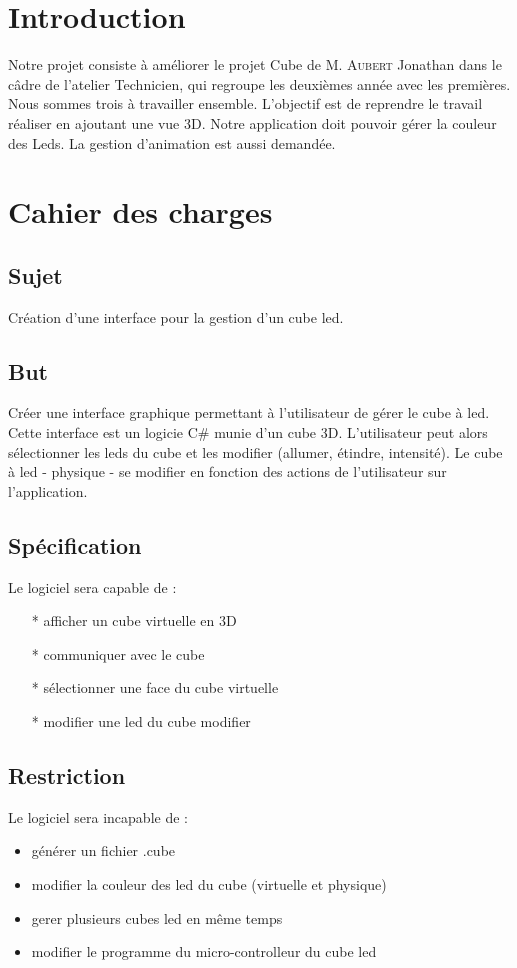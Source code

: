 \documentclass[a4paper,12pt]{article}
\begin{document}
\tableofcontents
\newpage

\section{Introduction}
Notre projet consiste à améliorer le projet Cube de M. \textsc{Aubert} Jonathan dans le câdre de l'atelier Technicien, qui regroupe les deuxièmes année avec les premières. Nous sommes trois à travailler ensemble. L'objectif est de reprendre le travail réaliser en ajoutant une vue 3D. Notre application doit pouvoir gérer la couleur des Leds. La gestion d'animation est aussi demandée.
\newpage

\section{Cahier des charges}
\subsection{Sujet}
Création d'une interface pour la gestion d'un cube led.

\subsection{But}
Créer une interface graphique permettant à l'utilisateur de gérer le cube à led. Cette interface est un logicie C\# munie d'un cube 3D. L'utilisateur peut alors sélectionner les leds du cube et les modifier (allumer, étindre, intensité). Le cube à led - physique - se modifier en fonction des actions de l'utilisateur sur l'application.
\subsection{Spécification}
Le logiciel sera capable de :
\begin{itemize}
	\item[*] afficher un cube virtuelle en 3D
	\item[*] communiquer avec le cube
	\item[*] sélectionner une face du cube virtuelle
	\item[*] modifier une led du cube modifier
\end{itemize}

\subsection{Restriction}
Le logiciel sera incapable de :
\begin{itemize}
	\item générer un fichier .cube
	\item modifier la couleur des led du cube (virtuelle et physique)
	\item gerer plusieurs cubes led en même temps
	\item modifier le programme du micro-controlleur du cube led
\end{itemize}
\end{document}
